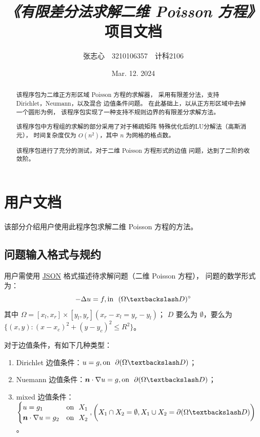\documentclass[lang=cn,a4paper,newtx,bibend=bibtex]{elegantpaper}
\title{\emph{《有限差分法求解二维 Poisson 方程》}项目文档}
\author{张志心~~3210106357~~计科2106}
\date{Mar. 12. 2024}
\begin{document}
\maketitle

\tableofcontents
\newpage

\begin{abstract}

  该程序包为二维正方形区域 Poisson 方程的求解器，
  采用有限差分法，支持 Dirichlet，Neumann，以及混合
  边值条件问题。
  在此基础上，以从正方形区域中去掉一个圆形为例，
  该程序包实现了一种支持不规则边界的有限差分求解方法。

  该程序包中方程组的求解的部分采用了对于稀疏矩阵
  特殊优化后的LU分解法（高斯消元），
  时间复杂度仅为 $O(n^2)$，其中 $n$ 为网格的格点数。
  
  该程序包进行了充分的测试，对于二维 Poisson 方程形式的边值
  问题，达到了二阶的收敛阶。
  
  
\end{abstract}

\section{用户文档}

该部分介绍用户使用此程序包求解二维 Poisson 方程的方法。

\subsection{问题输入格式与规约}
用户需使用 \href{https://www.json.org/json-en.html}{JSON} 格式描述待求解问题（二维 Poisson 方程），
问题的数学形式为：
\[
    - \Delta u = f, \text{in~~} (\Omega \fxg D)^{\circ}
\]
其中 $\Omega = [x_l, x_r] \times [y_l, y_r] (x_r - x_l = y_r - y_l)$；
$D$ 要么为 $\emptyset$，要么为 $\{(x, y) : (x - x_c)^2 + (y-y_c)^2 \le R^2\}$。

对于边值条件，有如下几种类型：
\begin{enumerate}
  \item Dirichlet 边值条件：$u = g, \text{on~~} \partial  (\Omega \fxg D)$；
  \item Nuemann 边值条件：$\bm{n} \cdot \nabla u = g, \text{on~~} \partial  (\Omega \fxg D)$；
  \item mixed 边值条件：$\begin{cases} u = g_1 & \text{on~~} X_1 \\ \bm{n} \cdot \nabla u = g_2 & \text{on~~} X_2\end{cases}, \bigg(X_1 \cap X_2 = \emptyset, X_1 \cup X_2 = \partial (\Omega \fxg D)\bigg)$。
\end{enumerate}
\end{document}
